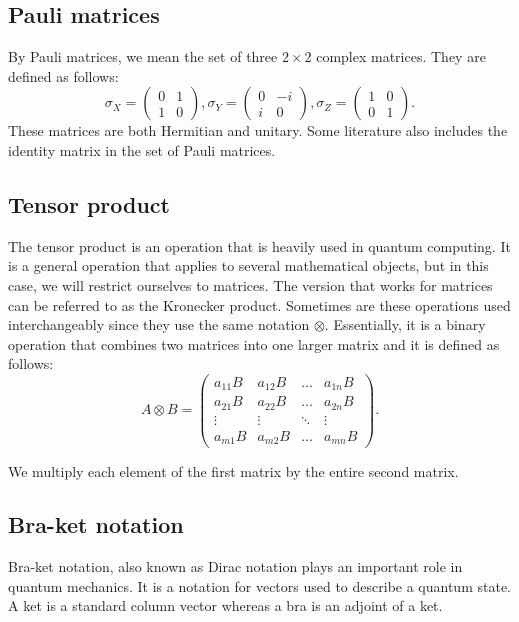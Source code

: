 \subsection*{Pauli matrices}\label{sec:pauli-matrices}
By Pauli matrices, we mean the set of three $2 \times 2$ complex matrices. They are defined as follows:
$$\sigma_X = \begin{pmatrix}
    0 & 1 \\
    1 & 0
\end{pmatrix}, \sigma_Y = \begin{pmatrix}
    0 & -i \\
    i & 0
\end{pmatrix}, \sigma_Z = \begin{pmatrix}
    1 & 0 \\
    0 & 1
\end{pmatrix}\text{.}$$ 
These matrices are both Hermitian and unitary. Some literature also includes the identity matrix in the set of Pauli matrices. 

\subsection*{Tensor product}
The tensor product is an operation that is heavily used in quantum computing. It is a general operation that applies to several mathematical objects, but in this case, we will restrict ourselves to matrices. The version that works for matrices can be referred to as the Kronecker product. Sometimes are these operations used interchangeably since they use the same notation $\otimes$. Essentially, it is a binary operation that combines two matrices into one larger matrix and it is defined as follows:
$$A \otimes B = \begin{pmatrix}
    a_{11}B & a_{12}B & \hdots & a_{1n}B \\
    a_{21}B & a_{22}B & \hdots & a_{2n}B \\
    \vdots & \vdots & \ddots & \vdots \\
    a_{m1}B & a_{m2}B & \hdots & a_{mn}B
\end{pmatrix}.$$

We multiply each element of the first matrix by the entire second matrix.

\subsection*{Bra-ket notation}
Bra-ket notation, also known as Dirac notation plays an important role in quantum mechanics. It is a notation for vectors used to describe a quantum state. A ket is a standard column vector whereas a bra is an adjoint of a ket. 

